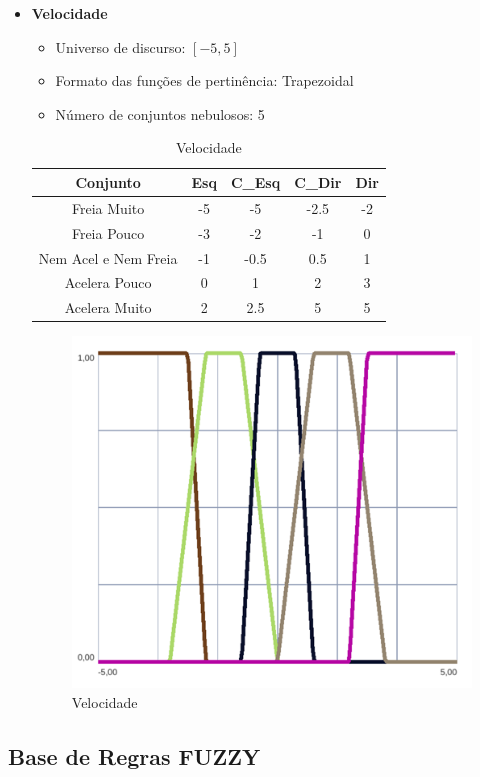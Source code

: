\begin{itemize}
            \newpage
            
        \item{\bf{Velocidade}}
            \begin{itemize}
                \item Universo de discurso: $[-5,5]$
                \item Formato das funções de pertinência: Trapezoidal
                \item Número de conjuntos nebulosos: 5
            \end{itemize}

            \begin{table}[H]
                \centering
                \begin{tabular}{|c|c|c|c|c|}
                    \hline
                    Conjunto               & Esq   & C\_Esq & C\_Dir & Dir   \\ \hline
                    Freia Muito            & -5    & -5     & -2.5   & -2    \\
                    Freia Pouco            & -3    & -2     & -1     & 0     \\
                    Nem Acel e Nem Freia   & -1    & -0.5   & 0.5    & 1     \\
                    Acelera Pouco          & 0     & 1      & 2      & 3     \\
                    Acelera Muito          & 2     & 2.5    & 5      & 5     \\ \hline
                \end{tabular}
                \caption{Velocidade}
            \end{table}

            \begin{figure}[H] 
                \centering
                \includegraphics[scale=0.7]{imagens/out_velocidade.png}
                \caption{Velocidade}
            \end{figure}

            \newpage
    \end{itemize}
    
    \subsection{Base de Regras FUZZY}

